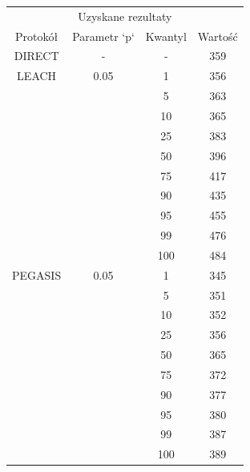 \documentclass[a4paper,12pt,twoside,openany]{report}
\begin{document}
\begin{longtable}{*{4}{c}}
\toprule
\multicolumn{4}{c}{Uzyskane rezultaty} \\
Protokół	& Parametr `p`	& Kwantyl	& Wartość \\
\midrule
\endhead
DIRECT	& - 	& -	& 359 \\*
\midrule
LEACH	& 0.05	& 1	& 356 \\*
	&	& 5	& 363 \\*
	&	& 10	& 365 \\*
	&	& 25	& 383 \\*
	&	& 50	& 396 \\*
	&	& 75	& 417 \\*
	&	& 90	& 435 \\*
	&	& 95	& 455 \\*
	&	& 99	& 476 \\*
	&	& 100	& 484 \\*
\midrule
PEGASIS	& 0.05	& 1	& 345 \\*
	&	& 5	& 351 \\*
	&	& 10	& 352 \\*
	&	& 25	& 356 \\*
	&	& 50	& 365 \\*
	&	& 75	& 372 \\*
	&	& 90	& 377 \\*
	&	& 95	& 380 \\*
	&	& 99	& 387 \\*
	&	& 100	& 389 \\*
\bottomrule
\end{longtable}
\end{document}
